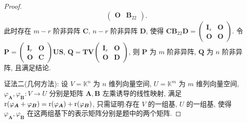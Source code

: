 \documentclass[../../main.tex]{subfiles}%
\begin{document}
\begin{proof}
$$\begin{pmatrix}
\boldsymbol{O} & \boldsymbol{B}_{22}
\end{pmatrix}.
$$
此时存在 $m - r$ 阶非异阵 $\boldsymbol{C}$, $n - r$ 阶非异阵 $\boldsymbol{D}$, 使得 $\boldsymbol{C}\boldsymbol{B}_{22}\boldsymbol{D} = \begin{pmatrix}
\boldsymbol{I}_s & \boldsymbol{O} \\
\boldsymbol{O} & \boldsymbol{O}
\end{pmatrix}$. 令 $\boldsymbol{P} = \begin{pmatrix}
\boldsymbol{I}_r & \boldsymbol{O} \\
\boldsymbol{O} & \boldsymbol{C}
\end{pmatrix}\boldsymbol{U}\boldsymbol{S}$, $\boldsymbol{Q} = \boldsymbol{T}\boldsymbol{V}\begin{pmatrix}
\boldsymbol{I}_r & \boldsymbol{O} \\
\boldsymbol{O} & \boldsymbol{D}
\end{pmatrix}$, 则 $\boldsymbol{P}$ 为 $m$ 阶非异阵, $\boldsymbol{Q}$ 为 $n$ 阶非异阵, 且满足结论.

{\color{blue}证法二(几何方法):} 设 $V = \mathbb{K}^n$ 为 $n$ 维列向量空间, $U = \mathbb{K}^m$ 为 $m$ 维列向量空间, $\varphi_{\boldsymbol{A}}, \varphi_{\boldsymbol{B}}: V \to U$ 分别是矩阵 $\boldsymbol{A}, \boldsymbol{B}$ 左乘诱导的线性映射, 满足 ${\rm r}(\varphi_{\boldsymbol{A}} + \varphi_{\boldsymbol{B}}) = {\rm r}(\varphi_{\boldsymbol{A}}) + {\rm r}(\varphi_{\boldsymbol{B}})$, 只需证明:存在 $V$ 的一组基, $U$ 的一组基, 使得 $\varphi_{\boldsymbol{A}}, \varphi_{\boldsymbol{B}}$ 在这两组基下的表示矩阵分别是题中的两个矩阵. 


\end{proof}
\end{document}
